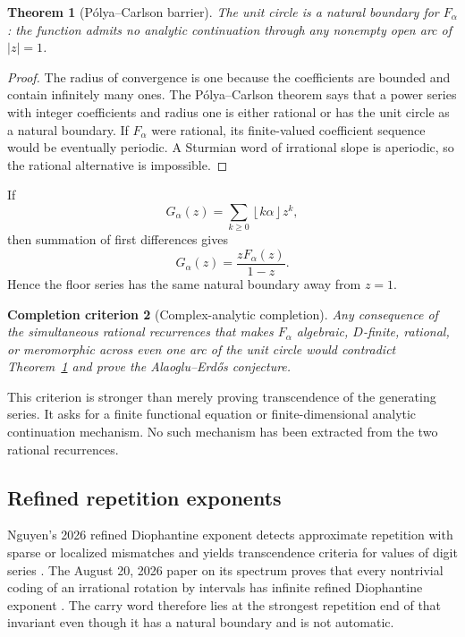 \documentclass[11pt,oneside]{article}
\newtheorem{theorem}{Theorem}[section]
\newtheorem{criterion}[theorem]{Completion criterion}
\theoremstyle{definition}
\theoremstyle{remark}
\newcommand{\floor}[1]{\left\lfloor #1\right\rfloor}
\begin{document}
\begin{theorem}[P\'olya--Carlson barrier]\label{thm:natural-boundary}
The unit circle is a natural boundary for $F_\alpha$: the function admits no analytic continuation through any nonempty open arc of $|z|=1$.
\end{theorem}

\begin{proof}
The radius of convergence is one because the coefficients are bounded and contain infinitely many ones.  The P\'olya--Carlson theorem \cite{Carlson1921,Polya1928} says that a power series with integer coefficients and radius one is either rational or has the unit circle as a natural boundary.  If $F_\alpha$ were rational, its finite-valued coefficient sequence would be eventually periodic.  A Sturmian word of irrational slope is aperiodic, so the rational alternative is impossible.
\end{proof}

If
\[
 G_\alpha(z)=\sum_{k\geq0}\floor{k\alpha}z^k,
\]
then summation of first differences gives
\begin{equation}\label{eq:floor-series}
 G_\alpha(z)=\frac{zF_\alpha(z)}{1-z}.
\end{equation}
Hence the floor series has the same natural boundary away from $z=1$.

\begin{criterion}[Complex-analytic completion]\label{crit:continuation}
Any consequence of the simultaneous rational recurrences that makes $F_\alpha$ algebraic, $D$-finite, rational, or meromorphic across even one arc of the unit circle would contradict Theorem~\ref{thm:natural-boundary} and prove the Alaoglu--Erd\H{o}s conjecture.
\end{criterion}

This criterion is stronger than merely proving transcendence of the generating series.  It asks for a finite functional equation or finite-dimensional analytic continuation mechanism.  No such mechanism has been extracted from the two rational recurrences.

\subsection{Refined repetition exponents}

Nguyen's 2026 refined Diophantine exponent detects approximate repetition with sparse or localized mismatches and yields transcendence criteria for values of digit series \cite{Nguyen2026a}.  The August 20, 2026 paper on its spectrum proves that every nontrivial coding of an irrational rotation by intervals has infinite refined Diophantine exponent \cite{Nguyen2026b}.  The carry word therefore lies at the strongest repetition end of that invariant even though it has a natural boundary and is not automatic.
\end{document}
